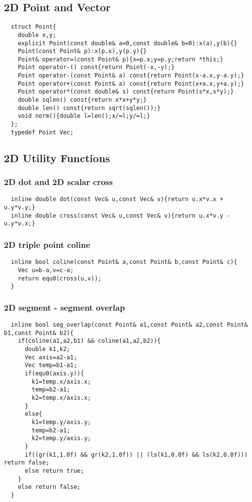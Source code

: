 \documentclass[a4paper]{article}
\begin{document}
\subsection{2D Point and Vector}
\begin{lstlisting}
  struct Point{
    double x,y;
    explicit Point(const double& a=0,const double& b=0):x(a),y(b){}
    Point(const Point& p):x(p.x),y(p.y){}
    Point& operator=(const Point& p){x=p.x;y=p.y;return *this;}
    Point operator-() const{return Point(-x,-y);}
    Point operator-(const Point& a) const{return Point(x-a.x,y-a.y);}
    Point operator+(const Point& a) const{return Point(x+a.x,y+a.y);}
    Point operator*(const double& s) const{return Point(s*x,s*y);}
    double sqlen() const{return x*x+y*y;}
    double len() const{return sqrt(sqlen());}
    void norm(){double l=len();x/=l;y/=l;}
  };
  typedef Point Vec;
\end{lstlisting}
\subsection{2D Utility Functions}
\subsubsection{2D dot and 2D scalar cross}
\begin{lstlisting}
  inline double dot(const Vec& u,const Vec& v){return u.x*v.x + u.y*v.y;}
  inline double cross(const Vec& u,const Vec& v){return u.x*v.y - u.y*v.x;}
\end{lstlisting}
\subsubsection{2D triple point coline}
\begin{lstlisting}
  inline bool coline(const Point& a,const Point& b,const Point& c){
    Vec u=b-a,v=c-a;
    return equ0(cross(u,v));
  }
\end{lstlisting}
\subsubsection{2D segment - segment overlap}
\begin{lstlisting}
  inline bool seg_overlap(const Point& a1,const Point& a2,const Point& b1,const Point& b2){
    if(coline(a1,a2,b1) && coline(a1,a2,b2)){
      double k1,k2;
      Vec axis=a2-a1;
      Vec temp=b1-a1;
      if(equ0(axis.y)){
        k1=temp.x/axis.x;
        temp=b2-a1;
        k2=temp.x/axis.x;
      }
      else{
        k1=temp.y/axis.y;
        temp=b2-a1;
        k2=temp.y/axis.y;
      }
      if((gr(k1,1.0f) && gr(k2,1.0f)) || (ls(k1,0.0f) && ls(k2,0.0f))) return false;
      else return true;
    }
    else return false;
  }
\end{lstlisting}
\end{document}
